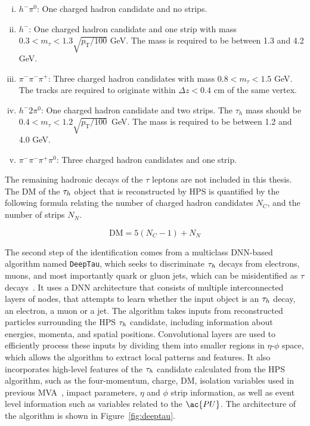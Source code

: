 \begin{enumerate}[i)]
\item $h^- \pi^0$: One charged hadron candidate and no strips.
\item $h^-$: One charged hadron candidate and one strip with mass $ 0.3 < m_{\tau} < 1.3 \sqrt{p_{\text{T}}/100}$ GeV. The mass is required to be between 1.3 and 4.2 GeV.
\item $\pi^- \pi^- \pi^+$: Three charged hadron candidates with mass $0.8 < m_{\tau} < 1.5$ GeV. The tracks are required to originate within $\Delta z<0.4$ cm of the same vertex.
\item $h^- 2\pi^0$: One charged hadron candidate and two strips. The $\tau_{h}$ mass should be $0.4 < m_{\tau} < 1.2\sqrt{p_{\text{T}}/100}$~GeV. The mass is required to be between 1.2 and 4.0 GeV.
\item $\pi^- \pi^- \pi^+ \pi^0$: Three charged hadron candidates and one strip.
\end{enumerate}

The remaining hadronic decays of the $\tau$ leptons are not included in this thesis.
The \ac{DM} of the $\tau_{h}$ object that is reconstructed by \ac{HPS} is quantified by the following formula relating the number of charged hadron candidates $N_C$, and the number of strips $N_N$.

\begin{equation}
\text{DM} = 5(N_{C} - 1) + N_{N}
\end{equation}

The second step of the identification comes from a multiclass \ac{DNN}-based algorithm named \texttt{DeepTau}, which seeks to discriminate $\tau_{h}$ decays from electrons, muons, and most importantly quark or gluon jets, which can be misidentified as $\tau$ decays~\cite{CMS:2022prd}.
It uses a \ac{DNN} architecture that consists of multiple interconnected layers of nodes, that attempts to learn whether the input object is an $\tau_{h}$ decay, an electron, a muon or a jet. 
The algorithm takes inputs from reconstructed particles surrounding the \ac{HPS} $\tau_{h}$ candidate, including information about energies, momenta, and spatial positions. 
Convolutional layers are used to efficiently process these inputs by dividing them into smaller regions in $\eta$-$\phi$ space, which allows the algorithm to extract local patterns and features. 
It also incorporates high-level features of the $\tau_{h}$ candidate calculated from the \ac{HPS} algorithm, such as the four-momentum, charge, \ac{DM}, isolation variables used in previous \ac{MVA}~\cite{CMS:2018jrd}, impact parameters, $\eta$ and $\phi$ strip information, as well as event level information such as variables related to the $\ac{PU}$.
The architecture of the algorithm is shown in Figure~\ref{fig:deeptau}. \\


